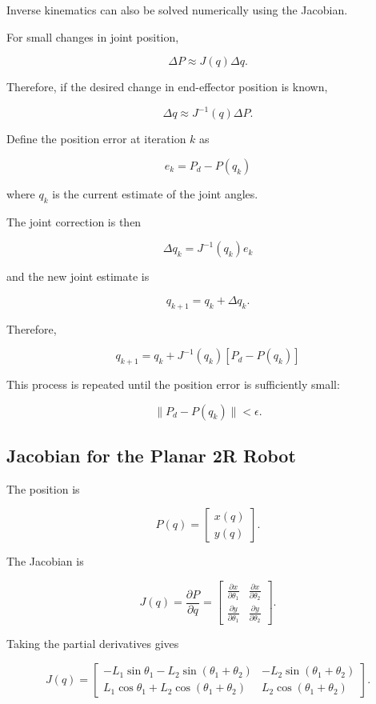 \documentclass{article}
\begin{document}
Inverse kinematics can also be solved numerically using the Jacobian.

For small changes in joint position,

\[
\Delta P
\approx
J(q)\Delta q.
\]

Therefore, if the desired change in end-effector position is known,

\[
\Delta q
\approx
J^{-1}(q)\Delta P.
\]

Define the position error at iteration $k$ as

\[
\boxed{
e_k=P_d-P(q_k)
}
\]

where $q_k$ is the current estimate of the joint angles.

The joint correction is then

\[
\boxed{
\Delta q_k
=
J^{-1}(q_k)e_k
}
\]

and the new joint estimate is

\[
\boxed{
q_{k+1}
=
q_k+\Delta q_k.
}
\]

Therefore,

\[
\boxed{
q_{k+1}
=
q_k+
J^{-1}(q_k)
\left[
P_d-P(q_k)
\right]
}
\]

This process is repeated until the position error is sufficiently small:

\[
\boxed{
\|P_d-P(q_k)\|<\epsilon.
}
\]


\subsection{Jacobian for the Planar 2R Robot}

The position is

\[
P(q)=
\begin{bmatrix}
x(q)\\
y(q)
\end{bmatrix}.
\]

The Jacobian is

\[
J(q)
=
\frac{\partial P}{\partial q}
=
\begin{bmatrix}
\frac{\partial x}{\partial\theta_1}
&
\frac{\partial x}{\partial\theta_2}
\\[4pt]
\frac{\partial y}{\partial\theta_1}
&
\frac{\partial y}{\partial\theta_2}
\end{bmatrix}.
\]

Taking the partial derivatives gives

\[
\boxed{
J(q)=
\begin{bmatrix}
-L_1\sin\theta_1-L_2\sin(\theta_1+\theta_2)
&
-L_2\sin(\theta_1+\theta_2)
\\[4pt]
L_1\cos\theta_1+L_2\cos(\theta_1+\theta_2)
&
L_2\cos(\theta_1+\theta_2)
\end{bmatrix}.
}
\]
\end{document}
